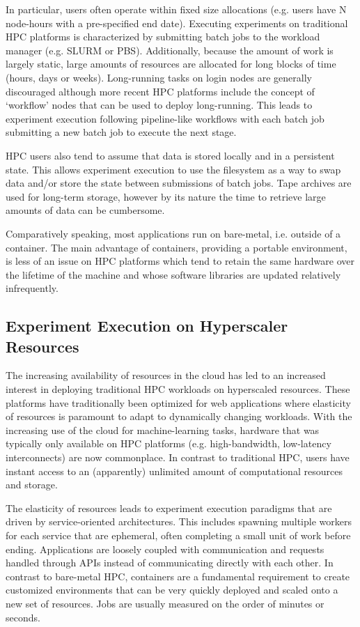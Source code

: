 \documentclass[utf8]{FrontiersinVancouver} %
\begin{document}
In particular, users often operate within fixed size allocations (e.g. users
have N node-hours with a pre-specified end date). Executing experiments on
traditional HPC platforms is characterized by submitting batch jobs to the
workload manager (e.g. SLURM or PBS). Additionally, because the amount of work
is largely static, large amounts of resources are allocated for long blocks of
time (hours, days or weeks). Long-running tasks on login nodes are generally
discouraged although more recent HPC platforms include the concept of `workflow'
nodes that can be used to deploy long-running. This leads to experiment
execution following pipeline-like workflows with each batch job submitting a new
batch job to execute the next stage.

HPC users also tend to assume that data is stored locally and in a persistent
state. This allows experiment execution to use the filesystem as a way to swap
data and/or store the state between submissions of batch jobs. Tape archives are
used for long-term storage, however by its nature the time to retrieve large
amounts of data can be cumbersome.

Comparatively speaking, most applications run on bare-metal, i.e. outside of a
container. The main advantage of containers, providing a portable environment,
is less of an issue on HPC platforms which tend to retain the same hardware over
the lifetime of the machine and whose software libraries are updated relatively
infrequently.

\subsection{Experiment Execution on Hyperscaler Resources}
The increasing availability of resources in the cloud has led to an increased
interest in deploying traditional HPC workloads on hyperscaled resources. These
platforms have traditionally been optimized for web applications where
elasticity of resources is paramount to adapt to dynamically changing workloads.
With the increasing use of the cloud for machine-learning tasks, hardware that
was typically only available on HPC platforms (e.g. high-bandwidth, low-latency
interconnects) are now commonplace. In contrast to traditional HPC, users
have instant access to an (apparently) unlimited amount of computational
resources and storage. 

The elasticity of resources leads to experiment execution paradigms that are
driven by service-oriented architectures. This includes spawning multiple
workers for each service that are ephemeral, often completing a small unit of
work before ending. Applications are loosely coupled with communication and
requests handled through APIs instead of communicating directly with each other.
In contrast to bare-metal HPC, containers are a fundamental requirement to
create customized environments that can be very quickly deployed and scaled onto
a new set of resources. Jobs are usually measured on the order of minutes or
seconds. 
\end{document}
